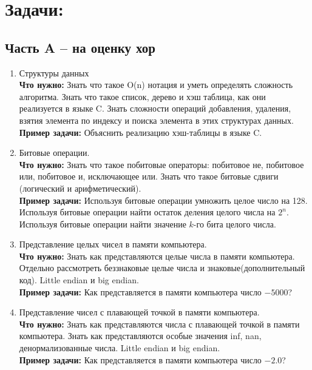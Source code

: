 \documentclass{article}
\begin{document}

\section*{Задачи:}
\subsection*{Часть A -- на оценку хор}

\begin{enumerate}

\item Структуры данных\\
\textbf{Что нужно:} Знать что такое O(n) нотация и уметь определять сложность алгоритма. Знать что такое список, дерево и хэш таблица, как они реализуется в языке C. Знать сложности операций добавления, удаления, взятия элемента по индексу и поиска элемента в этих структурах данных.\\
\textbf{Пример задачи:} Объяснить реализацию хэш-таблицы в языке C.

\item Битовые операции.\\
\textbf{Что нужно:} Знать что такое побитовые операторы: побитовое не, побитовое или, побитовое и, исключающее или. Знать что такое битовые сдвиги (логический и арифметический). \\
\textbf{Пример задачи:} Используя битовые операции умножить целое число на 128. Используя битовые операции найти остаток деления целого числа на $2^n$. Используя битовые операции найти значение $k$-го бита целого числа.

\item Представление целых чисел в памяти компьютера.\\
\textbf{Что нужно:} Знать как представляются целые числа в памяти компьютера. Отдельно рассмотреть беззнаковые целые числа и знаковые(дополнительный код). Little endian и big endian.\\
\textbf{Пример задачи:} Как представляется в памяти компьютера число $-5000$?

\item Представление чисел с плавающей точкой в памяти компьютера.\\
\textbf{Что нужно:} Знать как представляются числа с плавающей точкой в памяти компьютера. Знать как представляются особые значения inf, nan, денормализованные числа. Little endian и big endian.\\
\textbf{Пример задачи:} Как представляется в памяти компьютера число $-2.0$?


\end{enumerate}
\end{document}
